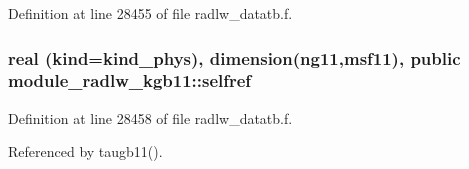 Definition at line 28455 of file radlw\+\_\+datatb.\+f.

\subsubsection[{\texorpdfstring{selfref}{selfref}}]{\setlength{\rightskip}{0pt plus 5cm}real (kind=kind\+\_\+phys), dimension(ng11,{\bf msf11}), public module\+\_\+radlw\+\_\+kgb11\+::selfref}\hypertarget{namespacemodule__radlw__kgb11_ac98edefcce668d56c3aadc241863741f}{}\label{namespacemodule__radlw__kgb11_ac98edefcce668d56c3aadc241863741f}


Definition at line 28458 of file radlw\+\_\+datatb.\+f.



Referenced by taugb11().

